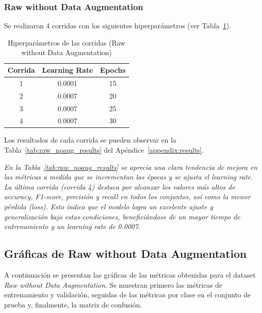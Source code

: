 \documentclass[conference]{IEEEtran}
\begin{document}
\subsubsection{Raw without Data Augmentation}
Se realizaron 4 corridas con los siguientes hiperparámetros (ver Tabla~\ref{tab:raw_noaug_hparams}).

\begin{table}[H]
\caption{Hiperparámetros de las corridas (Raw without Data Augmentation)}
\centering
\begin{tabular}{|c|c|c|}
\hline
\textbf{Corrida} & \textbf{Learning Rate} & \textbf{Epochs} \\
\hline
1 & 0.0001 & 15 \\
2 & 0.0007 & 20 \\
3 & 0.0007 & 25 \\
4 & 0.0007 & 30 \\
\hline
\end{tabular}
\label{tab:raw_noaug_hparams}
\end{table}

Los resultados de cada corrida se pueden observar en la Tabla~\ref{tab:raw_noaug_results} del Apéndice~\ref{appendix:results}.

\noindent\textit{
En la Tabla~\ref{tab:raw_noaug_results} se aprecia una clara tendencia de mejora en las métricas a medida que se incrementan las épocas y se ajusta el learning rate. La última corrida (corrida 4) destaca por alcanzar los valores más altos de accuracy, F1-score, precisión y recall en todos los conjuntos, así como la menor pérdida (loss). Esto indica que el modelo logra un excelente ajuste y generalización bajo estas condiciones, beneficiándose de un mayor tiempo de entrenamiento y un learning rate de 0.0007.
}

\subsection{Gráficas de Raw without Data Augmentation}

A continuación se presentan las gráficas de las métricas obtenidas para el dataset \textit{Raw without Data Augmentation}. Se muestran primero las métricas de entrenamiento y validación, seguidas de las métricas por clase en el conjunto de prueba y, finalmente, la matriz de confusión.

\end{document}
